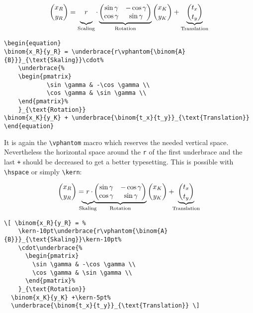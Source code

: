 \begin{table}[htb]
\begin{equation}
	\binom{x_R}{y_R} = \underbrace{r\vphantom{\binom{A}{B}}}_{\text{Scaling}}\cdot%
    \underbrace{%
		\begin{pmatrix}
    		\sin \gamma & -\cos \gamma \\
    		\cos \gamma & \sin \gamma \\
		\end{pmatrix}%
    }_{\text{Rotation}}
	\binom{x_K}{y_K} +
    \underbrace{\binom{t_x}{t_y}}_{\text{Translation}}
\end{equation}
\begin{lstlisting}
\begin{equation}
\binom{x_R}{y_R} = \underbrace{r\vphantom{\binom{A}{B}}}_{\text{Skaling}}\cdot%
    \underbrace{%
	\begin{pmatrix}
    		\sin \gamma & -\cos \gamma \\
    		\cos \gamma & \sin \gamma \\
	\end{pmatrix}%
    }_{\text{Rotation}}
\binom{x_K}{y_K} + \underbrace{\binom{t_x}{t_y}}_{\text{Translation}}
\end{equation}
\end{lstlisting}

It is again the \verb+\vphantom+ macro which reserves the needed vertical space.
Nevertheless the horizontal space around the \verb+r+ of the first underbrace and the last \verb|+| should
be decreased to get a better typesetting. This is possible with \verb+\hspace+ or
simply \verb+\kern+:

\[ \binom{x_R}{y_R} = %
    \kern-10pt\underbrace{r\vphantom{\binom{A}{B}}}_{\text{Skaling}}\kern-10pt%
    \cdot\underbrace{%
      \begin{pmatrix}
        \sin \gamma & -\cos \gamma \\
        \cos \gamma & \sin \gamma \\
      \end{pmatrix}%
    }_{\text{Rotation}}
  \binom{x_K}{y_K} +\kern-5pt%
  \underbrace{\binom{t_x}{t_y}}_{\text{Translation}} \]
\begin{lstlisting}
\[ \binom{x_R}{y_R} = %
    \kern-10pt\underbrace{r\vphantom{\binom{A}{B}}}_{\text{Skaling}}\kern-10pt%
    \cdot\underbrace{%
      \begin{pmatrix}
        \sin \gamma & -\cos \gamma \\
        \cos \gamma & \sin \gamma \\
      \end{pmatrix}%
    }_{\text{Rotation}}
  \binom{x_K}{y_K} +\kern-5pt%
  \underbrace{\binom{t_x}{t_y}}_{\text{Translation}} \]
\end{lstlisting}



\end{table}
